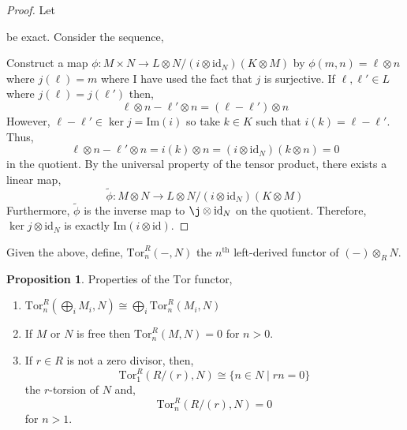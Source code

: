 \documentclass[12pt]{extarticle}
\newcommand{\id}{\mathrm{id}}
\renewcommand{\Im}[1]{\mathrm{Im}(#1)}
\theoremstyle{definition}
\newtheorem{proposition}[theorem]{Proposition}
\newenvironment{definition}[1][Definition:]{\begin{trivlist}
\item[\hskip \labelsep {\bfseries #1}]}{\end{trivlist}}
\newcommand{\Tor}[4]{\mathrm{Tor}^{#1}_{#2} \left( #3, #4 \right)}
\begin{document}
\begin{proof}
Let
\begin{center}
\end{center}
be exact. Consider the sequence,
\begin{center}
\end{center}
Construct a map $\phi : M \times N \to L \otimes N / (i \otimes \id_N)(K \otimes M)$ by $\phi(m,n) = \ell \otimes n$ where $j(\ell) = m$ where I have used the fact that $j$ is surjective. If $\ell, \ell' \in L$ where $j(\ell) = j(\ell')$ then,
\[ \ell \otimes n - \ell' \otimes n = (\ell - \ell') \otimes n \]
However, $\ell - \ell' \in \ker{j} = \Im{i}$ so take $k \in K$ such that $i(k) = \ell - \ell'$. Thus,
\[  \ell \otimes n - \ell' \otimes n = i(k) \otimes n = (i \otimes \id_N)(k \otimes n) = 0 \]
in the quotient. By the universal property of the tensor product, there exists a linear map,
\[ \tilde{\phi} : M \otimes N \to  L \otimes N / (i \otimes \id_N)(K \otimes M) \]
Furthermore, $\tilde{\phi}$ is the inverse map to $\j \otimes \id_N$ on the quotient. Therefore, $\ker{j \otimes \id_N}$ is exactly $\Im{i \otimes \id}$. 
\end{proof}

\begin{definition}
Given the above, define, $\Tor{R}{n}{-}{N}$ the $n^\mathrm{th}$ left-derived functor of $(-) \otimes_R N$.
\end{definition}

\begin{proposition}
Properties of the $\mathrm{Tor}$ functor,
\begin{enumerate}
\item $\Tor{R}{n}{\bigoplus_{i} M_i}{N} \cong \bigoplus_{i} \Tor{R}{n}{M_i}{N}$

\item If $M$ or $N$ is free then $\Tor{R}{n}{M}{N} = 0$ for $n > 0$.

\item If $r \in R$ is not a zero divisor, then,
\[ \Tor{R}{1}{R/(r)}{N} \cong \{n \in N \mid rn = 0 \} \]
the $r$-torsion of $N$ and,
\[ \Tor{R}{n}{R/(r)}{N} = 0 \]
for $n > 1$.
\end{enumerate}
\end{proposition}
\end{document}
